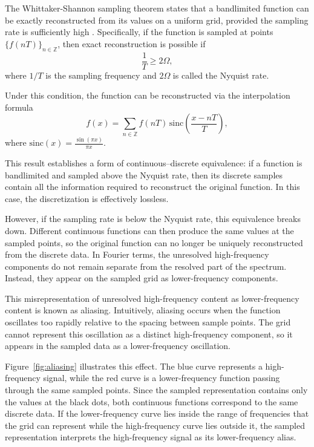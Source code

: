 The Whittaker-Shannon sampling theorem states that a bandlimited function can be exactly reconstructed from its values on a uniform grid, provided the sampling rate is sufficiently high \cite{signals-and-systems}. Specifically, if the function is sampled at points $\{f(nT)\}_{n \in \mathbb{Z}}$, then exact reconstruction is possible if
\begin{equation}
\frac{1}{T} \geq 2\Omega,
\end{equation}
where $1/T$ is the sampling frequency and $2\Omega$ is called the Nyquist rate.

Under this condition, the function can be reconstructed via the interpolation formula
\begin{equation}
f(x) = \sum_{n \in \mathbb{Z}} f(nT)\,\mathrm{sinc}\left(\frac{x - nT}{T}\right),
\end{equation}
where $\mathrm{sinc}(x) = \frac{\sin(\pi x)}{\pi x}$.

This result establishes a form of continuous--discrete equivalence: if a function is bandlimited and sampled above the Nyquist rate, then its discrete samples contain all the information required to reconstruct the original function. In this case, the discretization is effectively lossless.

However, if the sampling rate is below the Nyquist rate, this equivalence breaks down. Different continuous functions can then produce the same values at the sampled points, so the original function can no longer be uniquely reconstructed from the discrete data. In Fourier terms, the unresolved high-frequency components do not remain separate from the resolved part of the spectrum. Instead, they appear on the sampled grid as lower-frequency components.

This misrepresentation of unresolved high-frequency content as lower-frequency content is known as aliasing. Intuitively, aliasing occurs when the function oscillates too rapidly relative to the spacing between sample points. The grid cannot represent this oscillation as a distinct high-frequency component, so it appears in the sampled data as a lower-frequency oscillation.

Figure~\ref{fig:aliasing} illustrates this effect. The blue curve represents a high-frequency signal, while the red curve is a lower-frequency function passing through the same sampled points. Since the sampled representation contains only the values at the black dots, both continuous functions correspond to the same discrete data. If the lower-frequency curve lies inside the range of frequencies that the grid can represent while the high-frequency curve lies outside it, the sampled representation interprets the high-frequency signal as its lower-frequency alias.


